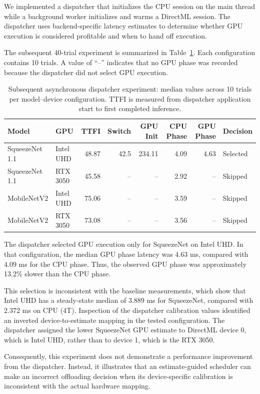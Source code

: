 \documentclass[pdflatex,sn-mathphys-num]{sn-jnl}
\begin{document}
We implemented a dispatcher that initializes the CPU session on the main thread while a background worker initializes and warms a DirectML session. The dispatcher uses backend-specific latency estimates to determine whether GPU execution is considered profitable and when to hand off execution.

The subsequent 40-trial experiment is summarized in Table~\ref{tab:dispatcher}. Each configuration contains 10 trials. A value of ``--'' indicates that no GPU phase was recorded because the dispatcher did not select GPU execution.

\begin{table}[ht]
\caption{Subsequent asynchronous dispatcher experiment: median values across 10 trials per model--device configuration. TTFI is measured from dispatcher application start to first completed inference.}
\label{tab:dispatcher}
\centering
\small
\begin{tabular}{@{}llrrrrrl@{}}
\toprule
Model & GPU & TTFI & Switch & GPU Init & CPU Phase & GPU Phase & Decision \\
\midrule
SqueezeNet 1.1 & Intel UHD & 48.87 & 42.5 & 234.11 & 4.09 & 4.63 & Selected \\
SqueezeNet 1.1 & RTX 3050 & 45.58 & -- & -- & 2.92 & -- & Skipped \\
MobileNetV2 & Intel UHD & 75.06 & -- & -- & 3.59 & -- & Skipped \\
MobileNetV2 & RTX 3050 & 73.08 & -- & -- & 3.56 & -- & Skipped \\
\bottomrule
\end{tabular}
\end{table}

The dispatcher selected GPU execution only for SqueezeNet on Intel UHD. In that configuration, the median GPU phase latency was 4.63 ms, compared with 4.09 ms for the CPU phase. Thus, the observed GPU phase was approximately 13.2\% slower than the CPU phase.

This selection is inconsistent with the baseline measurements, which show that Intel UHD has a steady-state median of 3.889 ms for SqueezeNet, compared with 2.372 ms on CPU (4T). Inspection of the dispatcher calibration values identified an inverted device-to-estimate mapping in the tested configuration. The dispatcher assigned the lower SqueezeNet GPU estimate to DirectML device 0, which is Intel UHD, rather than to device 1, which is the RTX 3050.

Consequently, this experiment does not demonstrate a performance improvement from the dispatcher. Instead, it illustrates that an estimate-guided scheduler can make an incorrect offloading decision when its device-specific calibration is inconsistent with the actual hardware mapping.
\end{document}
